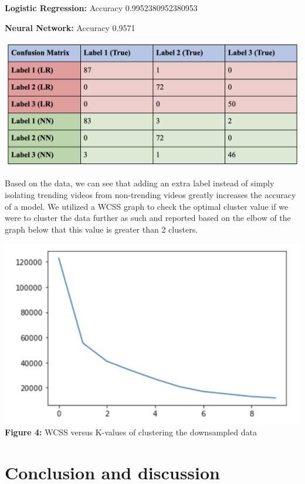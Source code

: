 \documentclass{article}
\begin{document}
\textbf{Logistic Regression:} Accuracy 0.9952380952380953
\par \textbf{Neural Network:} Accuracy 0.9571 
\begin{center}
\includegraphics[scale=.7]{multi_label.png}\\
\end{center}
\quad Based on the data, we can see that adding an extra label instead of simply isolating trending videos from non-trending videos greatly increases the accuracy of a model. We utilized a WCSS graph to check the optimal cluster value if we were to cluster the data further as such and reported based on the elbow of the graph below that this value is greater than 2 clusters.\\
\begin{center}
\includegraphics[scale=.8]{figure4.png}\\

\textbf{Figure 4:} WCSS versus K-values of clustering the downsampled data
\end{center}
\section*{Conclusion and discussion}
\end{document}
